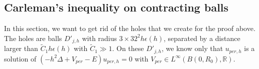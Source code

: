 \documentclass[leqno,11pt,letterpaper, english]{amsart}
\theoremstyle{plain}
\theoremstyle{definition}
\numberwithin{equation}{section}
\def\R{\mathbb R}
\begin{document}

\subsection{Carleman's inequality  on contracting balls}
\label{subsect: Carleman_classique}
In this section, we want to get rid of the holes that we create for the proof above. The holes are balls  $D'_{j,h}$ with radius $3 \times 32^2 h\epsilon(h)$, separated by a distance larger than $\tilde{C}_1 h\epsilon(h)$ with $\tilde{C}_1 \gg 1$.
On these $D'_{j,h}$, we know only that $u_{per,h}$ is a solution of $(-h^2\Delta + V_{per} - E)u_{per,h} = 0$ with $V_{per} \in L^\infty(B(0,R_0),\R)$.
\end{document}
